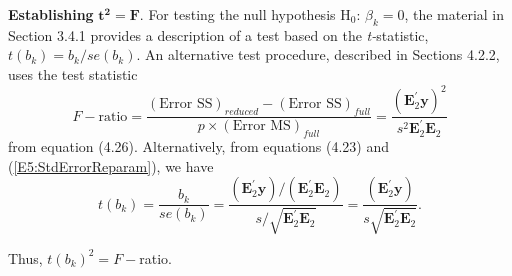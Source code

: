 \textbf{Establishing }$\mathbf{t}^{\mathbf{2}}\mathbf{=F}$. For
testing the null hypothesis H$_0$: $\beta_{k}=0$, the material in
Section 3.4.1 provides a description of a test based on the
\textit{t-}statistic, $t(b_{k})=b_{k}/se(b_{k})$. An alternative
test procedure, described in Sections 4.2.2, uses the test statistic
\begin{equation*}
F-\text{ratio} = \frac{(\text{Error SS})_{reduced}-(\text{Error SS}
)_{full}} {p \times (\text{Error MS})_{full}} = \frac{\left(
\mathbf{E}_2^{\prime}\mathbf{y}\right) ^2}{s^2\mathbf{E}_2^{\prime}
\mathbf{E}_2}
\end{equation*}
from equation (4.26). Alternatively, from equations (4.23) and
(\ref{E5:StdErrorReparam}), we have
\begin{equation}\label{E5:tStat}
t(b_{k})=\frac{b_{k}}{se(b_{k})}=\frac{\left( \mathbf{E}_2^{\prime}
\mathbf{y}\right) /\left( \mathbf{E}_2^{\prime}\mathbf{E}_2\right)}
{s/\sqrt{\mathbf{E}_2^{\prime}\mathbf{E}_2}}= \frac{\left(
\mathbf{E}_2^{\prime}\mathbf{y}\right) }{s\sqrt{
\mathbf{E}_2^{\prime}\mathbf{E}_2}}.
\end{equation}

\noindent Thus, $t(b_{k})^2=F-$ratio.

